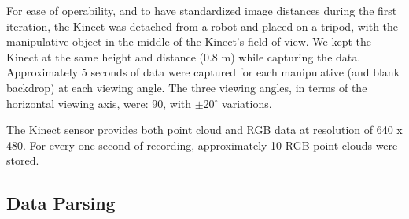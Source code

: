 \documentclass{article}
\begin{document}
For ease of operability, and to have standardized image distances during the first iteration, the Kinect  was detached from a robot and placed on a tripod, with the manipulative object in the middle of the Kinect's field-of-view. We kept the Kinect at the same height and distance (0.8 m) while capturing the data. Approximately 5 seconds of data were captured for each manipulative (and blank backdrop) at each viewing angle. The three viewing angles, in terms of the horizontal viewing axis, were: 90, with \(\pm\)20$^{\circ}$ variations.

The Kinect sensor provides both point cloud and RGB data at resolution of 640 x 480. For every one second of recording, approximately 10 RGB point clouds were stored.

\subsection{Data Parsing}
\end{document}
